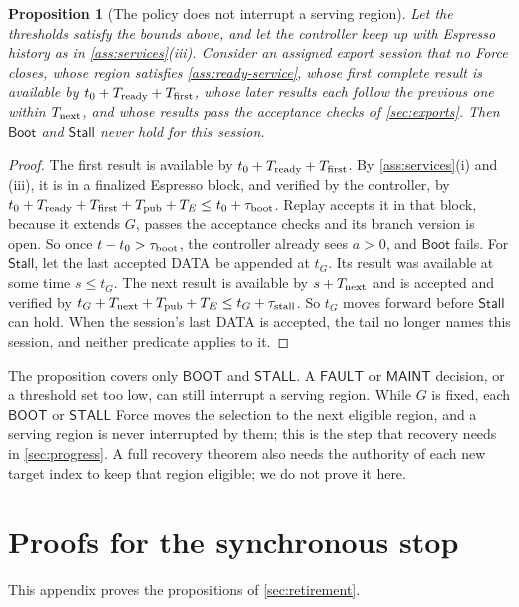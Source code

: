 \documentclass[11pt,a4paper]{article}
\newcommand{\tagg}[1]{\ensuremath{\mathsf{#1}}}
\newtheorem{proposition}[proposition]{Proposition}
\begin{document}
\begin{proposition}[The policy does not interrupt a serving region]
\label{prop:policy-noninterference}
Let the thresholds satisfy the bounds above, and let the controller keep
up with Espresso history as in \cref{ass:services}(iii). Consider an
assigned export session that no Force closes, whose region satisfies
\cref{ass:ready-service}, whose first complete result is available by
$t_0+T_{\rm ready}+T_{\rm first}$, whose later results each follow the
previous one within $T_{\rm next}$, and whose results pass the
acceptance checks of \cref{sec:exports}. Then $\tagg{Boot}$ and
$\tagg{Stall}$ never hold for this session.
\end{proposition}
\begin{proof}
The first result is available by $t_0+T_{\rm ready}+T_{\rm first}$. By
\cref{ass:services}(i) and (iii), it is in a finalized Espresso block,
and verified by the controller, by
$t_0+T_{\rm ready}+T_{\rm first}+T_{\rm pub}+T_E\le
t_0+\tau_{\rm boot}$. Replay accepts it in that block, because
it extends $G$, passes the acceptance checks and its branch version is
open. So once $t-t_0>\tau_{\rm boot}$, the controller already
sees $a>0$, and $\tagg{Boot}$ fails. For $\tagg{Stall}$, let the last
accepted DATA be appended at $t_G$. Its result was available at some
time $s\le t_G$. The next result is available by $s+T_{\rm next}$ and is
accepted and verified by $t_G+T_{\rm next}+T_{\rm pub}+T_E\le
t_G+\tau_{\rm stall}$. So $t_G$ moves forward before $\tagg{Stall}$ can
hold. When the session's last DATA is accepted, the tail no longer names
this session, and neither predicate applies to it.
\end{proof}

The proposition covers only \tagg{BOOT} and \tagg{STALL}. A \tagg{FAULT}
or \tagg{MAINT} decision, or a threshold set too low, can still
interrupt a serving region. While $G$ is fixed, each \tagg{BOOT} or
\tagg{STALL} Force moves the selection to the next eligible region, and
a serving region is never interrupted by them; this is the step that
recovery needs in \cref{sec:progress}. A full recovery theorem also needs
the authority of each new target index to keep that region eligible; we
do not prove it here.

\section{Proofs for the synchronous stop}
\label{app:retirement-proofs}
This appendix proves the propositions of \cref{sec:retirement}.
\end{document}
